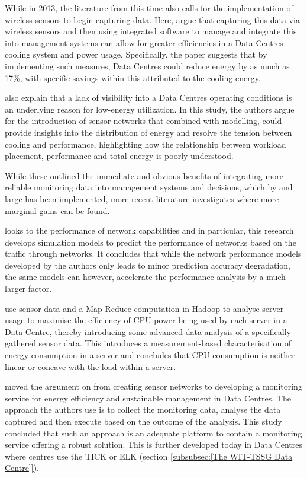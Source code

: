 \documentclass[12pt]{scrartcl}
\begin{document}
While in 2013, the literature from this time also calls for the implementation of wireless sensors to begin capturing data. Here, \citet{edssch.qt9c84f49g20130101} argue that capturing this data via wireless sensors and then using integrated software to manage and integrate this into management systems can allow for greater efficiencies in a Data Centres cooling system and power usage. Specifically, the paper suggests that by implementing such measures, Data Centres could reduce energy by as much as 17\%, with specific savings within this attributed to the cooling energy.

\citet{edsjsr.4134817120120101} also explain that a lack of visibility into a Data Centres operating conditions is an underlying reason for low-energy utilization. In this study, the authors argue for the introduction of sensor networks that combined with modelling, could provide insights into the distribution of energy and resolve the tension between cooling and performance, highlighting how the relationship between workload placement, performance and total energy is poorly understood.    

While these outlined the immediate and obvious benefits of integrating more reliable monitoring data into management systems and decisions, which by and large has been implemented, more recent literature investigates where more marginal gains can be found.  

\citet{edsdoj.47fdd5c4e23a43e3aa37ddd2fb75d82b20160101} looks to the performance of network capabilities and in particular, this research develops simulation models to predict the performance of networks based on the traffic through networks. It concludes that while the  network performance models developed by the authors only leads to minor prediction accuracy degradation, the same models can however, accelerate the performance analysis by a much larger factor. 

\citet{edsarx.1402.080420140101} use sensor data and a Map-Reduce computation in Hadoop to analyse server usage to maximise the efficiency of CPU power being used by each server in a Data Centre, thereby introducing some advanced data analysis of a specifically gathered sensor data. This introduces a measurement-based characterisation of energy consumption in a server and concludes that CPU consumption is neither linear or concave with the load within a server. 

\citet{edsbas.DFD37F4F20160101} moved the argument on from creating sensor networks to developing a monitoring service for energy efficiency and sustainable management in Data Centres. The approach the authors use is to collect the monitoring data, analyse the data captured and then execute based on the outcome of the analysis. This study concluded that such an approach is an adequate platform to contain a monitoring service offering a robust solution. This is further developed today in Data Centres where centres use the TICK or ELK (section \ref{subsubsec:[The WIT-TSSG Data Centre]}).  
\end{document}
